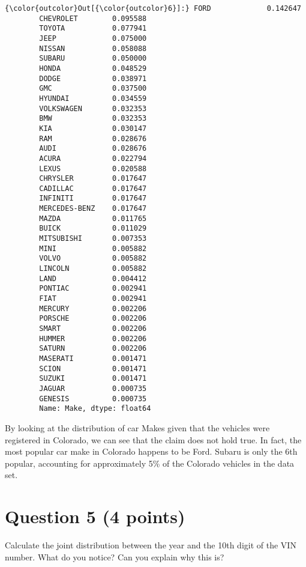 \documentclass[11pt]{article}
\begin{document}
\begin{Verbatim}[commandchars=\\\{\}]
{\color{outcolor}Out[{\color{outcolor}6}]:} FORD             0.142647
        CHEVROLET        0.095588
        TOYOTA           0.077941
        JEEP             0.075000
        NISSAN           0.058088
        SUBARU           0.050000
        HONDA            0.048529
        DODGE            0.038971
        GMC              0.037500
        HYUNDAI          0.034559
        VOLKSWAGEN       0.032353
        BMW              0.032353
        KIA              0.030147
        RAM              0.028676
        AUDI             0.028676
        ACURA            0.022794
        LEXUS            0.020588
        CHRYSLER         0.017647
        CADILLAC         0.017647
        INFINITI         0.017647
        MERCEDES-BENZ    0.017647
        MAZDA            0.011765
        BUICK            0.011029
        MITSUBISHI       0.007353
        MINI             0.005882
        VOLVO            0.005882
        LINCOLN          0.005882
        LAND             0.004412
        PONTIAC          0.002941
        FIAT             0.002941
        MERCURY          0.002206
        PORSCHE          0.002206
        SMART            0.002206
        HUMMER           0.002206
        SATURN           0.002206
        MASERATI         0.001471
        SCION            0.001471
        SUZUKI           0.001471
        JAGUAR           0.000735
        GENESIS          0.000735
        Name: Make, dtype: float64
\end{Verbatim}
            
    By looking at the distribution of car Makes given that the vehicles were
registered in Colorado, we can see that the claim does not hold true. In
fact, the most popular car make in Colorado happens to be Ford. Subaru
is only the 6th popular, accounting for approximately 5\% of the
Colorado vehicles in the data set.

    \hypertarget{question-5-4-points}{%
\section{Question 5 (4 points)}\label{question-5-4-points}}

Calculate the joint distribution between the year and the 10th digit of
the VIN number. What do you notice? Can you explain why this is?
\end{document}
